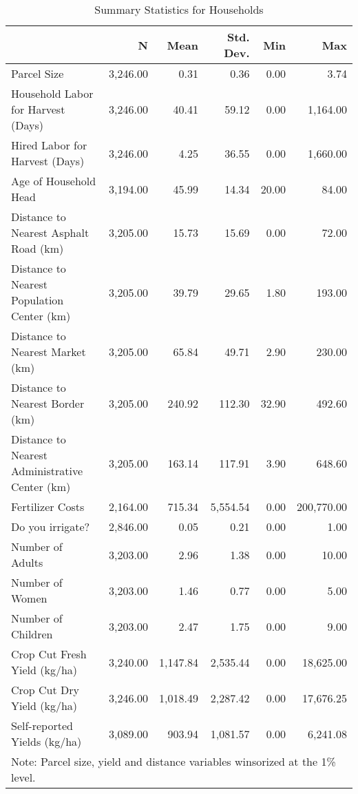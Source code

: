 \begin{table}
\caption{Summary Statistics for Households}
\label{tbl:summary}
\begin{tabular}{lrrrrr}
\toprule
{} & {N} & {Mean} & {Std. Dev.} & {Min} & {Max} \\
\midrule
Parcel Size & 3,246.00 & 0.31 & 0.36 & 0.00 & 3.74 \\
Household Labor for Harvest (Days) & 3,246.00 & 40.41 & 59.12 & 0.00 & 1,164.00 \\
Hired Labor for Harvest (Days) & 3,246.00 & 4.25 & 36.55 & 0.00 & 1,660.00 \\
Age of Household Head & 3,194.00 & 45.99 & 14.34 & 20.00 & 84.00 \\
Distance to Nearest Asphalt Road (km) & 3,205.00 & 15.73 & 15.69 & 0.00 & 72.00 \\
Distance to Nearest Population Center (km) & 3,205.00 & 39.79 & 29.65 & 1.80 & 193.00 \\
Distance to Nearest Market (km) & 3,205.00 & 65.84 & 49.71 & 2.90 & 230.00 \\
Distance to Nearest Border (km) & 3,205.00 & 240.92 & 112.30 & 32.90 & 492.60 \\
Distance to Nearest Administrative Center (km) & 3,205.00 & 163.14 & 117.91 & 3.90 & 648.60 \\
Fertilizer Costs & 2,164.00 & 715.34 & 5,554.54 & 0.00 & 200,770.00 \\
Do you irrigate? & 2,846.00 & 0.05 & 0.21 & 0.00 & 1.00 \\
Number of Adults & 3,203.00 & 2.96 & 1.38 & 0.00 & 10.00 \\
Number of Women & 3,203.00 & 1.46 & 0.77 & 0.00 & 5.00 \\
Number of Children & 3,203.00 & 2.47 & 1.75 & 0.00 & 9.00 \\
Crop Cut Fresh Yield (kg/ha) & 3,240.00 & 1,147.84 & 2,535.44 & 0.00 & 18,625.00 \\
Crop Cut Dry Yield (kg/ha) & 3,246.00 & 1,018.49 & 2,287.42 & 0.00 & 17,676.25 \\
Self-reported Yields (kg/ha) & 3,089.00 & 903.94 & 1,081.57 & 0.00 & 6,241.08 \\
\bottomrule
\multicolumn{6}{l}{Note: Parcel size, yield and distance variables winsorized at the 1\% level.}
\end{tabular}
\end{table}
